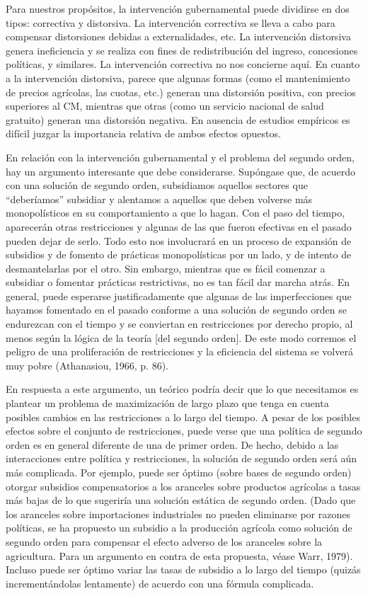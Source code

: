 \documentclass[10pt,a4paper]{article}
\begin{document}
Para nuestros propósitos, la intervención gubernamental puede dividirse en dos tipos: correctiva y distorsiva. La intervención correctiva se lleva a cabo para compensar distorsiones debidas a externalidades, etc. La intervención distorsiva genera ineficiencia y se realiza con fines de redistribución del ingreso, concesiones políticas, y similares. La intervención correctiva no nos concierne aquí. En cuanto a la intervención distorsiva, parece que algunas formas (como el mantenimiento de precios agrícolas, las cuotas, etc.) generan una distorsión positiva, con precios superiores al CM, mientras que otras (como un servicio nacional de salud gratuito) generan una distorsión negativa. En ausencia de estudios empíricos es difícil juzgar la importancia relativa de ambos efectos opuestos.

En relación con la intervención gubernamental y el problema del segundo orden, hay un argumento interesante que debe considerarse. Supóngase que, de acuerdo con una solución de segundo orden, subsidiamos aquellos sectores que “deberíamos” subsidiar y alentamos a aquellos que deben volverse más monopolísticos en su comportamiento a que lo hagan. Con el paso del tiempo, aparecerán otras restricciones y algunas de las que fueron efectivas en el pasado pueden dejar de serlo. Todo esto nos involucrará en un proceso de expansión de subsidios y de fomento de prácticas monopolísticas por un lado, y de intento de desmantelarlas por el otro. Sin embargo, mientras que es fácil comenzar a subsidiar o fomentar prácticas restrictivas, no es tan fácil dar marcha atrás. En general, puede esperarse justificadamente que algunas de las imperfecciones que hayamos fomentado en el pasado conforme a una solución de segundo orden se endurezcan con el tiempo y se conviertan en restricciones por derecho propio, al menos según la lógica de la teoría [del segundo orden]. De este modo corremos el peligro de una proliferación de restricciones y la eficiencia del sistema se volverá muy pobre (Athanasiou, 1966, p. 86).

En respuesta a este argumento, un teórico podría decir que lo que necesitamos es plantear un problema de maximización de largo plazo que tenga en cuenta posibles cambios en las restricciones a lo largo del tiempo. A pesar de los posibles efectos sobre el conjunto de restricciones, puede verse que una política de segundo orden es en general diferente de una de primer orden. De hecho, debido a las interacciones entre política y restricciones, la solución de segundo orden será aún más complicada. Por ejemplo, puede ser óptimo (sobre bases de segundo orden) otorgar subsidios compensatorios a los aranceles sobre productos agrícolas a tasas más bajas de lo que sugeriría una solución estática de segundo orden. (Dado que los aranceles sobre importaciones industriales no pueden eliminarse por razones políticas, se ha propuesto un subsidio a la producción agrícola como solución de segundo orden para compensar el efecto adverso de los aranceles sobre la agricultura. Para un argumento en contra de esta propuesta, véase Warr, 1979). Incluso puede ser óptimo variar las tasas de subsidio a lo largo del tiempo (quizás incrementándolas lentamente) de acuerdo con una fórmula complicada.
\end{document}
